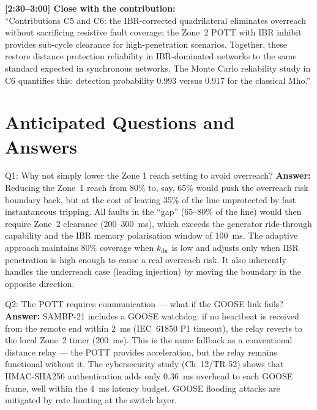 \documentclass[12pt,a4paper]{article}
\newcommand{\kibr}{k_\mathrm{ibr}}
\begin{document}
\begin{speakbox}
\textbf{[2:30--3:00] Close with the contribution:}\\
``Contributions C5 and C6: the IBR-corrected quadrilateral eliminates overreach without sacrificing resistive fault coverage; the Zone~2 POTT with IBR inhibit provides sub-cycle clearance for high-penetration scenarios. Together, these restore distance protection reliability in IBR-dominated networks to the same standard expected in synchronous networks. The Monte Carlo reliability study in C6 quantifies this: detection probability 0.993 versus 0.917 for the classical Mho.''
\end{speakbox}

\section{Anticipated Questions and Answers}

\begin{keybox}{Q1: Why not simply lower the Zone 1 reach setting to avoid overreach?}
\textbf{Answer:} Reducing the Zone~1 reach from 80\% to, say, 65\% would push the overreach risk boundary back, but at the cost of leaving 35\% of the line unprotected by fast instantaneous tripping. All faults in the ``gap'' (65--80\% of the line) would then require Zone~2 clearance (200--300~ms), which exceeds the generator ride-through capability and the IBR memory polarisation window of 100~ms. The adaptive approach maintains 80\% coverage when $\kibr$ is low and adjusts only when IBR penetration is high enough to cause a real overreach risk. It also inherently handles the underreach case (leading injection) by moving the boundary in the opposite direction.
\end{keybox}

\begin{keybox}{Q2: The POTT requires communication --- what if the GOOSE link fails?}
\textbf{Answer:} SAMBP-21 includes a GOOSE watchdog: if no heartbeat is received from the remote end within 2~ms (IEC~61850 P1 timeout), the relay reverts to the local Zone~2 timer (200~ms). This is the same fallback as a conventional distance relay --- the POTT provides acceleration, but the relay remains functional without it. The cybersecurity study (Ch~12/TR-52) shows that HMAC-SHA256 authentication adds only 0.36~ms overhead to each GOOSE frame, well within the 4~ms latency budget. GOOSE flooding attacks are mitigated by rate limiting at the switch layer.
\end{keybox}
\end{document}
